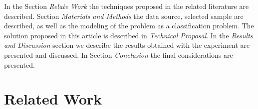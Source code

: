 \documentclass[10pt,letterpaper]{article}
\begin{document}
In the Section \emph{Relate Work} the techniques proposed in the related literature are described. Section \emph{Materials and Methods} the data source, selected sample are described, as well as the modeling of the problem as a classification problem.
The solution proposed in this article is described in \emph{Technical Proposal}. In the \emph{Results and Discussion} section we describe the results obtained with the experiment are presented and discussed. In Section \emph{Conclusion} the final considerations are presented.

\section*{Related Work}
%
%
%
%
\end{document}
